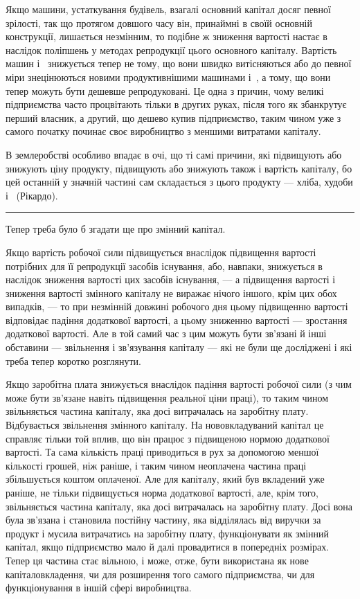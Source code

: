 Якщо машини, устаткування будівель, взагалі основний капітал досяг певної зрілості, так що протягом
довшого часу
він, принаймні в своїй основній конструкції, лишається незмінним, то подібне ж зниження вартості
настає в наслідок поліпшень
у методах репродукції цього основного капіталу. Вартість
машин і~ знижується тепер не тому, що вони швидко
витісняються або до певної міри знецінюються новими продуктивнішими
машинами і~, а тому, що вони тепер можуть
бути дешевше репродуковані. Це одна з причин, чому великі підприємства
часто процвітають тільки в других руках, після того
як збанкрутує перший власник, а другий, що дешево купив
підприємство, таким чином уже з самого початку починає своє
виробництво з меншими витратами капіталу.

В землеробстві особливо впадає в очі, що ті самі причини,
які підвищують або знижують ціну продукту, підвищують або
знижують також і вартість капіталу, бо цей останній у значній
частині сам складається з цього продукту — хліба, худоби і~
(Рікардо).

\pfbreak

Тепер треба було б згадати ще про змінний капітал.

Якщо вартість робочої сили підвищується внаслідок підвищення
вартості потрібних для її репродукції засобів існування,
або, навпаки, знижується в наслідок зниження вартості цих засобів
існування, — а підвищення вартості і зниження вартості
змінного капіталу не виражає нічого іншого, крім цих обох випадків, — то при незмінній довжині
робочого дня цьому підвищенню вартості відповідає падіння додаткової вартості, а цьому
зниженню вартості — зростання додаткової вартості. Але в той
самий час з цим можуть бути зв’язані й інші обставини — звільнення і зв’язування капіталу — які не
були ще досліджені і які
треба тепер коротко розглянути.

Якщо заробітна плата знижується внаслідок падіння вартості робочої сили (з чим може бути зв’язане
навіть підвищення
реальної ціни праці), то таким чином звільняється частина капіталу, яка досі витрачалась на
заробітну плату. Відбувається
звільнення змінного капіталу. На нововкладуваний капітал це
справляє тільки той вплив, що він працює з підвищеною нормою додаткової вартості. Та сама кількість
праці приводиться
в рух за допомогою меншої кількості грошей, ніж раніше, і таким чином неоплачена частина праці
збільшується коштом
оплаченої. Але для капіталу, який був вкладений уже раніше,
не тільки підвищується норма додаткової вартості, але, крім
того, звільняється частина капіталу, яка досі витрачалась на
заробітну плату. Досі вона була зв’язана і становила постійну
частину, яка відділялась від виручки за продукт і мусила витрачатись на заробітну плату,
функціонувати як змінний капітал,
якщо підприємство мало й далі провадитися в попередніх розмірах. Тепер ця частина стає вільною, і
може, отже, бути використана як нове капіталовкладення, чи для розширення того самого підприємства,
чи для функціонування в іншій сфері
виробництва.
